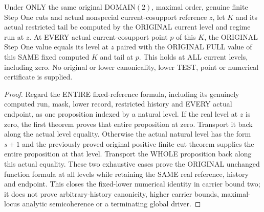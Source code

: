 \begin{theorem}
\label{hir:original-finite-cut-all-level-fixed-lower-value}
\leanok
Under ONLY the same original DOMAIN$(2)$, maximal order, genuine finite
Step One cuts and actual nonspecial current-cosupport reference $z$, let
$K$ and its actual restricted tail be computed by the ORIGINAL current
level and regime run at $z$. At EVERY actual current-cosupport point $p$
of this $K$, the ORIGINAL Step One value equals its level at $z$ paired
with the ORIGINAL FULL value of this SAME fixed computed $K$ and tail at
$p$. This holds at ALL current levels, including zero. No original or
lower canonicality, lower TEST, point or numerical certificate is supplied.
\end{theorem}
\begin{proof}
Regard the ENTIRE fixed-reference formula, including its genuinely computed
run, mask, lower record, restricted history and EVERY actual endpoint, as
one proposition indexed by a natural level. If the real level at $z$ is
zero, the first theorem proves that entire proposition at zero. Transport
it back along the actual level equality. Otherwise the actual natural
level has the form $s+1$ and the previously proved original positive finite
cut theorem supplies the entire proposition at that level. Transport the
WHOLE proposition back along this actual equality. These two exhaustive
cases prove the ORIGINAL unchanged function formula at all levels while
retaining the SAME real reference, history and endpoint. This closes the
fixed-lower numerical identity in carrier bound two; it does not prove
arbitrary-history canonicity, higher carrier bounds, maximal-locus analytic
semicoherence or a terminating global driver.
\end{proof}
